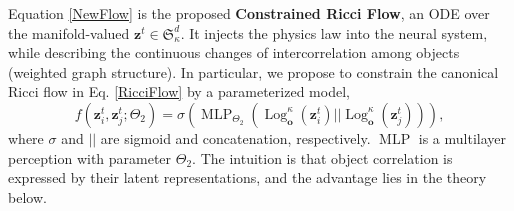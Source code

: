 Equation \ref{NewFlow} is the proposed \textbf{Constrained Ricci Flow}, 
an ODE over the manifold-valued $\boldsymbol{z}^t \in \mathfrak{S}^d_\kappa$.
It injects the physics law into the neural system,
while describing the continuous changes of intercorrelation among objects (weighted graph structure).
In particular, 
we propose to constrain the canonical Ricci flow in Eq. \ref{RicciFlow} by a parameterized model,
\begin{equation}
f(\boldsymbol{z}_i^t, \boldsymbol{z}_j^t; \Theta_2)=\sigma(\operatorname{MLP}_{\Theta_2}(\operatorname{Log}_{\boldsymbol{o}}^\kappa(\boldsymbol z_i^t)||\operatorname{Log}_{\boldsymbol{o}}^\kappa(\boldsymbol z_j^t))),
\label{ConstraintFunc}
\end{equation}
where $\sigma$ and  $||$ are sigmoid  and concatenation, respectively. $\operatorname{MLP}$ is a multilayer perception with  parameter $\Theta_2$.
The intuition is that object correlation is expressed by their latent representations,
and the advantage lies in the theory below.


